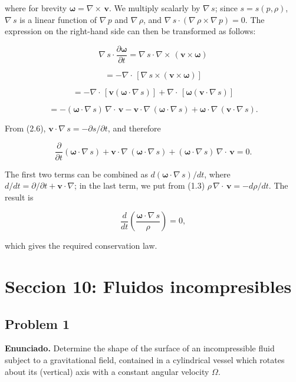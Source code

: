 \documentclass{article}
\begin{document}
where for brevity $\boldsymbol{\omega} = \nabla \times \, \mathbf{v}$. We multiply scalarly by $\nabla \, s$; since $s = s(p, \rho)$, $\nabla \, s$ is a linear function of $\nabla \, p$ and $\nabla \, \rho$, and $\nabla \, s \cdot (\nabla \, \rho \times \nabla \, p) = 0$. The expression on the right-hand side can then be transformed as follows:

$$
\nabla \, s \cdot \frac{\partial \boldsymbol{\omega}}{\partial t} = \nabla \, s \cdot \nabla \times \, (\mathbf{v} \times \boldsymbol{\omega})
$$

$$
= -\nabla \cdot \, [\nabla \, s \times (\mathbf{v} \times \boldsymbol{\omega})]
$$

$$
= -\nabla \cdot \, [\mathbf{v} (\boldsymbol{\omega} \cdot \nabla \, s)] + \nabla \cdot \, [\boldsymbol{\omega} (\mathbf{v} \cdot \nabla \, s)]
$$

$$
= -(\boldsymbol{\omega} \cdot \nabla \, s) \, \nabla \cdot \, \mathbf{v} - \mathbf{v} \cdot \nabla \, (\boldsymbol{\omega} \cdot \nabla \, s) + \boldsymbol{\omega} \cdot \nabla \, (\mathbf{v} \cdot \nabla \, s).
$$

From (2.6), $\mathbf{v} \cdot \nabla \, s = -\partial s/\partial t$, and therefore

$$
\frac{\partial}{\partial t} (\boldsymbol{\omega} \cdot \nabla \, s) + \mathbf{v} \cdot \nabla \, (\boldsymbol{\omega} \cdot \nabla \, s) + (\boldsymbol{\omega} \cdot \nabla \, s) \, \nabla \cdot \, \mathbf{v} = 0.
$$

The first two terms can be combined as $d(\boldsymbol{\omega} \cdot \nabla \, s)/dt$, where $d/dt = \partial/\partial t + \mathbf{v} \cdot \nabla$; in the last term, we put from (1.3) $\rho \, \nabla \cdot \, \mathbf{v} = -d\rho/dt$. The result is

$$
\frac{d}{dt} \left( \frac{\boldsymbol{\omega} \cdot \nabla \, s}{\rho} \right) = 0,
$$

which gives the required conservation law.

\section*{Seccion 10: Fluidos incompresibles}
\subsection*{Problem 1}

\textbf{Enunciado.} Determine the shape of the surface of an incompressible fluid subject to a gravitational field, contained in a cylindrical vessel which rotates about its (vertical) axis with a constant angular velocity $\Omega$.
\end{document}
